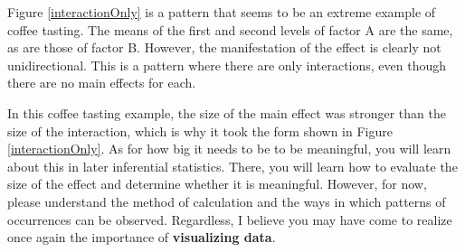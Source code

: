 \documentclass{ltjbook}
\begin{document}
Figure \ref{interactionOnly} is a pattern that seems to be an extreme example of coffee tasting. The means of the first and second levels of factor A are the same, as are those of factor B. However, the manifestation of the effect is clearly not unidirectional. This is a pattern where there are only interactions, even though there are no main effects for each.



In this coffee tasting example, the size of the main effect was stronger than the size of the interaction, which is why it took the form shown in Figure \ref{interactionOnly}. As for how big it needs to be to be meaningful, you will learn about this in later inferential statistics. There, you will learn how to evaluate the size of the effect and determine whether it is meaningful. However, for now, please understand the method of calculation and the ways in which patterns of occurrences can be observed. Regardless, I believe you may have come to realize once again the importance of \textbf{visualizing data}.


\end{document}
